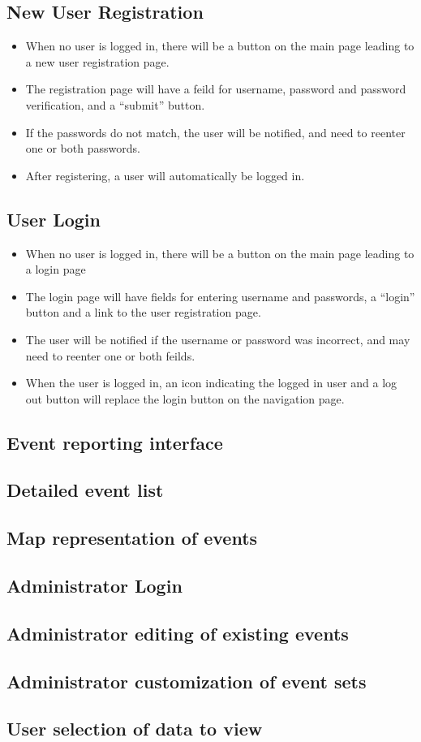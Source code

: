 \subsection{New User Registration}
\begin{itemize}
\item When no user is logged in, there will be a button on the main page leading to a new user registration page.
\item The registration page will have a feild for username, password and password verification, and a ``submit'' button.
\item If the passwords do not match, the user will be notified, and need to reenter one or both passwords.
\item After registering, a user will automatically be logged in.
\end{itemize}
\subsection{User Login}
\begin{itemize}
\item When no user is logged in, there will be a button on the main page leading to a login page
\item The login page will have fields for entering username and passwords, a ``login'' button and a link to the user registration page.
\item The user will be notified if the username or password was incorrect, and may need to reenter one or both feilds.
\item When the user is logged in, an icon indicating the logged in user and a log out button will replace the login button on the navigation page.
\end{itemize}
\subsection{Event reporting interface}
\subsection{Detailed event list}
\subsection{Map representation of events}
\subsection{Administrator Login}
\subsection{Administrator editing of existing events}
\subsection{Administrator customization of event sets}
\subsection{User selection of data to view}

